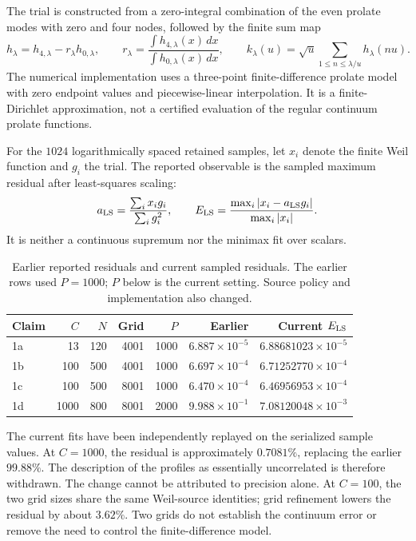 \documentclass[11pt,a4paper]{article}
\begin{document}
The trial is constructed from a zero-integral combination of the
even prolate modes with zero and four nodes, followed by the finite
sum map
\[
 h_\lambda=h_{4,\lambda}-r_\lambda h_{0,\lambda},\qquad
 r_\lambda=\frac{\int h_{4,\lambda}(x)\,dx}{\int h_{0,\lambda}(x)\,dx},
 \qquad k_\lambda(u)=\sqrt u\sum_{1\leq n\leq\lambda/u}h_\lambda(nu).
\]
The numerical implementation uses a three-point finite-difference
prolate model with zero endpoint values and piecewise-linear
interpolation. It is a finite-Dirichlet approximation, not a
certified evaluation of the regular continuum prolate functions.

For the $1024$ logarithmically spaced retained samples, let $x_i$
denote the finite Weil function and $g_i$ the trial. The reported
observable is the sampled maximum residual after least-squares scaling:
\[
 a_{\rm LS}=\frac{\sum_i x_i g_i}{\sum_i g_i^2},\qquad
 E_{\rm LS}=\frac{\max_i|x_i-a_{\rm LS}g_i|}{\max_i|x_i|}.
\]
It is neither a continuous supremum nor the minimax fit over scalars.

\begin{table}[htbp]
\centering\small
\caption{Earlier reported residuals and current sampled residuals.
The earlier rows used $P=1000$; $P$ below is the current setting.
Source policy and implementation also changed.}
\label{tab:prolate}
\begin{tabular}{@{}lrrrrrr@{}}
\toprule
Claim & $C$ & $N$ & Grid & $P$ & Earlier & Current $E_{\rm LS}$ \\
\midrule
1a & 13 & 120 & 4001 & 1000 & $6.887\times10^{-5}$ & $6.88681023\times10^{-5}$ \\
1b & 100 & 500 & 4001 & 1000 & $6.697\times10^{-4}$ & $6.71252770\times10^{-4}$ \\
1c & 100 & 500 & 8001 & 1000 & $6.470\times10^{-4}$ & $6.46956953\times10^{-4}$ \\
1d & 1000 & 800 & 8001 & 2000 & $9.988\times10^{-1}$ & $7.08120048\times10^{-3}$ \\
\bottomrule
\end{tabular}
\end{table}

The current fits have been independently replayed on the serialized
sample values. At $C=1000$, the residual is approximately $0.7081\%$,
replacing the earlier $99.88\%$. The description of the profiles as
essentially uncorrelated is therefore withdrawn. The change cannot
be attributed to precision alone. At $C=100$, the two grid sizes
share the same Weil-source identities; grid refinement lowers the
residual by about $3.62\%$. Two grids do not establish the continuum
error or remove the need to control the finite-difference model.
\end{document}
